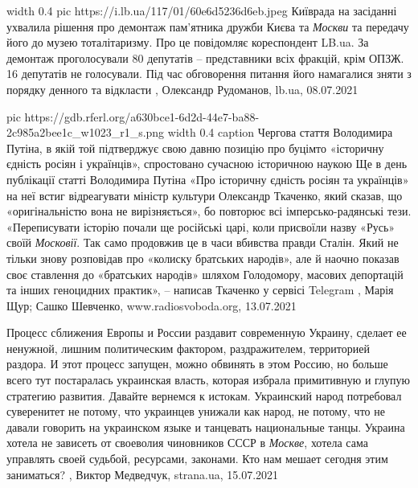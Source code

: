 \ifcmt
  width 0.4
  pic https://i.lb.ua/117/01/60e6d5236d6eb.jpeg
\fi
Київрада на засіданні ухвалила рішення про демонтаж пам'ятника дружби Києва та
\emph{Москви} та передачу його до музею тоталітаризму. Про це повідомляє
кореспондент LB.ua.  За демонтаж проголосували 80 депутатів – представники всіх
фракцій, крім ОПЗЖ.  16 депутатів не голосували. Під час обговорення питання
його намагалися зняти з порядку денного та відкласти
, 
Олександр Рудоманов, lb.ua, 08.07.2021

\ifcmt
  pic https://gdb.rferl.org/a630bce1-6d2d-44e7-ba88-2c985a2bee1c_w1023_r1_s.png
  width 0.4
  caption Чергова стаття Володимира Путіна, в якій той підтверджує свою давню позицію про буцімто «історичну єдність росіян і українців», спростовано сучасною історичною наукою
\fi
Ще в день публікації статті Володимира Путіна «Про історичну єдність росіян та
українців» на неї встиг відреагувати міністр культури Олександр Ткаченко, який
сказав, що «оригінальністю вона не вирізняється», бо повторює всі
імперсько-радянські тези.  «Переписувати історію почали ще російські царі, коли
присвоїли назву «Русь» своїй \emph{Московії}. Так само продовжив це в часи вбивства
правди Сталін. Який не тільки знову розповідав про «колиску братських народів»,
але й наочно показав своє ставлення до «братських народів» шляхом Голодомору,
масових депортацій та інших геноцидних практик», – написав Ткаченко у сервісі
Telegram
, 
Марія Щур; Сашко Шевченко, www.radiosvoboda.org, 13.07.2021

Процесс сближения Европы и России раздавит современную Украину, сделает ее
ненужной, лишним политическим фактором, раздражителем, территорией раздора. И
этот процесс запущен, можно обвинять в этом Россию, но больше всего тут
постаралась украинская власть, которая избрала примитивную и глупую стратегию
развития.  Давайте вернемся к истокам. Украинский народ потребовал суверенитет
не потому, что украинцев унижали как народ, не потому, что не давали говорить
на украинском языке и танцевать национальные танцы. Украина хотела не зависеть
от своеволия чиновников СССР в \emph{Москве}, хотела сама управлять своей
судьбой, ресурсами, законами. Кто нам мешает сегодня этим заниматься?
, 
Виктор Медведчук, strana.ua, 15.07.2021



